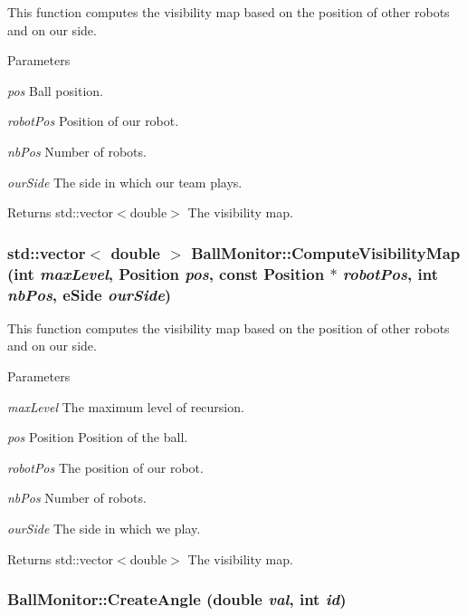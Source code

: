This function computes the visibility map based on the position of other robots and on our side. 


\begin{DoxyParams}{Parameters}
\item[{\em pos}]Ball position. \item[{\em robotPos}]Position of our robot. \item[{\em nbPos}]Number of robots. \item[{\em ourSide}]The side in which our team plays. \end{DoxyParams}
\begin{DoxyReturn}{Returns}
std::vector$<$double$>$ The visibility map. 
\end{DoxyReturn}
\hypertarget{classBallMonitor_a0d2ef73ba2b0573021c800c311e08245}{
\subsubsection[{ComputeVisibilityMap}]{\setlength{\rightskip}{0pt plus 5cm}std::vector$<$ double $>$ BallMonitor::ComputeVisibilityMap (int {\em maxLevel}, \/  Position {\em pos}, \/  const Position $\ast$ {\em robotPos}, \/  int {\em nbPos}, \/  eSide {\em ourSide})}}
\label{classBallMonitor_a0d2ef73ba2b0573021c800c311e08245}


This function computes the visibility map based on the position of other robots and on our side. 


\begin{DoxyParams}{Parameters}
\item[{\em maxLevel}]The maximum level of recursion. \item[{\em pos}]Position Position of the ball. \item[{\em robotPos}]The position of our robot. \item[{\em nbPos}]Number of robots. \item[{\em ourSide}]The side in which we play. \end{DoxyParams}
\begin{DoxyReturn}{Returns}
std::vector$<$double$>$ The visibility map. 
\end{DoxyReturn}
\hypertarget{classBallMonitor_a805b7229e7db773c56e9987d794ada9a}{
\subsubsection[{CreateAngle}]{ BallMonitor::CreateAngle (double {\em val}, \/  int {\em id})}}
\label{classBallMonitor_a805b7229e7db773c56e9987d794ada9a}


